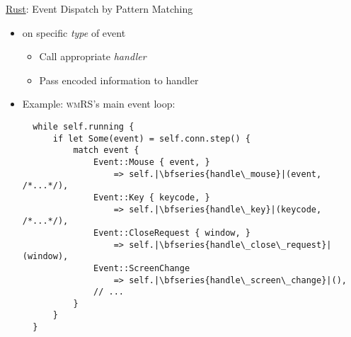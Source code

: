 \begin{frame}[fragile]{\underline{Rust}: Event Dispatch by Pattern Matching \hfill {\footnotesize \currentname}}


    \begin{itemize}

        \item {} on specific \textit{type} of event
            \begin{itemize}
                \item Call appropriate \textit{handler}
                \item Pass encoded information to handler
            \end{itemize}

        \item Example: \textsc{wmRS}'s main event loop:\\
\begin{verbatim}
  while self.running {
      if let Some(event) = self.conn.step() {
          match event {
              Event::Mouse { event, }
                  => self.|\bfseries{handle\_mouse}|(event, /*...*/),
              Event::Key { keycode, }
                  => self.|\bfseries{handle\_key}|(keycode, /*...*/),
              Event::CloseRequest { window, }
                  => self.|\bfseries{handle\_close\_request}|(window),
              Event::ScreenChange
                  => self.|\bfseries{handle\_screen\_change}|(),
              // ...
          }
      }
  }
\end{verbatim}

    \end{itemize}

    \vfill

\end{frame}

